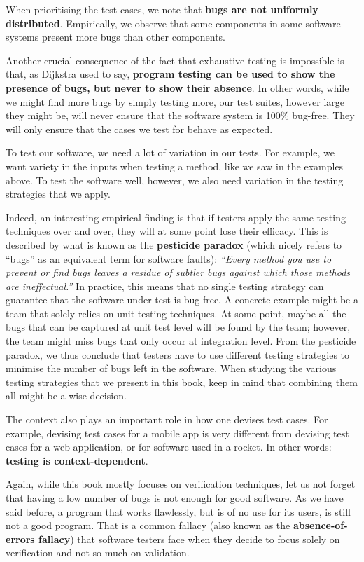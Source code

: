 When prioritising the test cases, we note that \textbf{bugs are not
uniformly distributed}. Empirically, we observe that some components in
some software systems present more bugs than other components.

Another crucial consequence of the fact that exhaustive testing is
impossible is that, as Dijkstra used to say, \textbf{program testing can
be used to show the presence of bugs, but never to show their absence}.
In other words, while we might find more bugs by simply testing more,
our test suites, however large they might be, will never ensure that the
software system is 100\% bug-free. They will only ensure that the cases
we test for behave as expected.

To test our software, we need a lot of variation in our tests. For
example, we want variety in the inputs when testing a method, like we
saw in the examples above. To test the software well, however, we also
need variation in the testing strategies that we apply.

Indeed, an interesting empirical finding is that if testers apply the
same testing techniques over and over, they will at some point lose
their efficacy. This is described by what is known as the
\textbf{pesticide paradox} (which nicely refers to ``bugs'' as an
equivalent term for software faults): \emph{``Every method you use to
prevent or find bugs leaves a residue of subtler bugs against which
those methods are ineffectual.''} In practice, this means that no single
testing strategy can guarantee that the software under test is bug-free.
A concrete example might be a team that solely relies on unit testing
techniques. At some point, maybe all the bugs that can be captured at
unit test level will be found by the team; however, the team might miss
bugs that only occur at integration level. From the pesticide paradox,
we thus conclude that testers have to use different testing strategies
to minimise the number of bugs left in the software. When studying the
various testing strategies that we present in this book, keep in mind
that combining them all might be a wise decision.

The context also plays an important role in how one devises test cases.
For example, devising test cases for a mobile app is very different from
devising test cases for a web application, or for software used in a
rocket. In other words: \textbf{testing is context-dependent}.

Again, while this book mostly focuses on verification techniques, let us
not forget that having a low number of bugs is not enough for good
software. As we have said before, a program that works flawlessly, but
is of no use for its users, is still not a good program. That is a
common fallacy (also known as the \textbf{absence-of-errors fallacy})
that software testers face when they decide to focus solely on
verification and not so much on validation.

